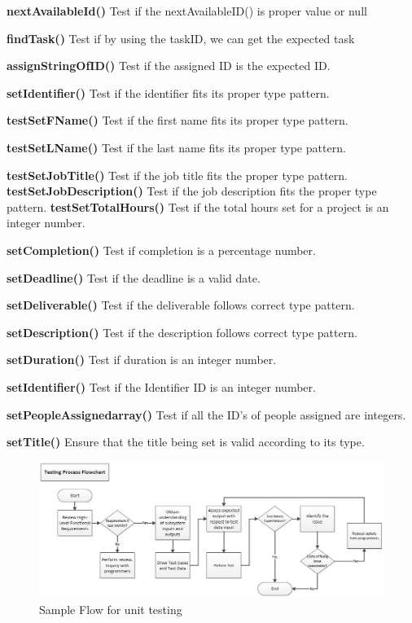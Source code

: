 \documentclass[12pt]{article}
\begin{document}
{\bf nextAvailableId()}
{
Test if the nextAvailableID() is proper value or null
}

{\bf findTask()}
{
Test if by using the taskID, we can get the expected task
}

{\bf assignStringOfID()} 
{
Test if the assigned ID is the expected ID.
}

{\bf setIdentifier()}
{
Test if the identifier fits its proper type pattern.
}

{\bf testSetFName()}
{
Test if the first name fits its proper type pattern.
}

{\bf testSetLName()}
{
Test if the last name fits its proper type pattern.
}

{\bf testSetJobTitle()}{
Test if the job title fits the proper type pattern.
}
{\bf testSetJobDescription()}
{
Test if the job description fits the proper type pattern.
}
{\bf testSetTotalHours()}
{
 Test if the total hours set for a project is an integer number.
}

{\bf setCompletion()}
{
Test if completion is a percentage number.
}

{\bf setDeadline()}
{
Test if the deadline is a valid date.
}

{\bf setDeliverable()}
{
Test if the deliverable follows correct type pattern.
}

{\bf setDescription()}
{
Test if the description follows correct type pattern.
}

{\bf setDuration()}
{
Test if duration is an integer number.
}

{\bf setIdentifier()}
{
Test if the Identifier ID is an integer number.
}

{\bf setPeopleAssignedarray()}
{
Test if all the ID's of people assigned are integers.
}

{\bf setTitle()}
{
Ensure that the title being set is valid according to its type.
}

\begin{figure}[htbp]

\begin{center} \includegraphics[scale=.6]{TestDiagram.jpg} \end{center}
\label{fig:testing-diagram}
\caption{Sample Flow for unit testing}

\end{figure}
\end{document}
